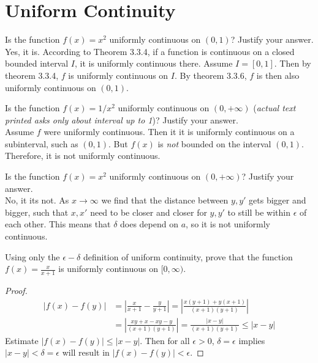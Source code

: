 \documentclass[12pt]{book}
\newenvironment{exercise}[2][Exercise]{\begin{trivlist}
\item[\hskip \labelsep {\bfseries #1}\hskip \labelsep {\bfseries #2.}]}{\end{trivlist}}
\begin{document}
\section{Uniform Continuity}

\begin{exercise}{3.3.1}
Is the function $f(x)=x^2$ uniformly continuous on $(0,1)$? Justify your answer. \\

Yes, it is. According to Theorem 3.3.4, if a function is continuous on a closed bounded interval $I$, it is uniformly continuous there. Assume $I=[0,1]$. Then by theorem 3.3.4, $f$ is uniformly continuous on $I$. By theorem 3.3.6, $f$ is then also uniformly continuous on $(0,1)$.
\end{exercise}


\begin{exercise}{3.3.2}
    Is the function $f(x)=1/x^2$ uniformly continuous on $(0,+\infty)$ (\emph{actual text printed asks only about interval up to 1})? Justify your answer. \\
    
    Assume $f$ were uniformly continuous. Then it it is uniformly continuous on a subinterval, such as $(0,1)$. But $f(x)$ is \emph{not} bounded on the interval $(0,1)$. Therefore, it is not uniformly continuous. 
\end{exercise}


\begin{exercise}{3.3.3}
Is the function $f(x) = x^2$ uniformly continuous on $(0, + \infty)$? Justify your answer.  \\

No, it its not. As $x \to \infty$ we find that the distance between $y,y'$ gets bigger and bigger, such that $x,x'$ need to be closer and closer for $y,y'$ to still be within $\epsilon$ of each other. This means that $\delta$ does depend on $a$, so it is not uniformly continuous. 
\end{exercise}


\begin{exercise}{3.3.4}
    Using only the $\epsilon-\delta$ definition of uniform continuity, prove that the function $f(x)=\frac{x}{x+1}$ is uniformly continuous on $[0,\infty)$.
    
    \begin{proof}
        \begin{align*}
        |f(x)-f(y)| &= | \frac{x}{x+1} - \frac{y}{y+1} | = |\frac{x(y+1) + y(x+1)}{(x+1)(y+1)}| \\
         &= |\frac{xy+x-xy-y}{(x+1)(y+1)}| = \frac{|x-y|}{(x+1)(y+1)} \leq |x-y|
         \end{align*}
    Estimate $|f(x)-f(y)|\leq |x-y|$. Then for all $\epsilon> 0$, $\delta = \epsilon$ implies $|x-y|<\delta = \epsilon$ will result in $|f(x)-f(y)|<\epsilon$.
    \end{proof}
\end{exercise}
\end{document}
